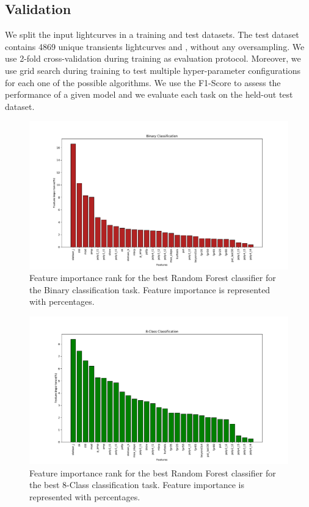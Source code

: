\documentclass[a4paper,fleqn,usenatbib]{mnras}
\begin{document}
\subsection{Validation} \label{subsection_importances}

We split the input lightcurves in a training and test datasets. 
The test dataset contains 4869 unique transients lightcurves and , without any
oversampling. 
We use 2-fold cross-validation during training as evaluation
protocol. 
Moreover, we use grid search during training to test multiple
hyper-parameter configurations for each one  of the possible
algorithms. 
We use the F1-Score to assess the performance of a given model and 
we evaluate each task on the held-out test dataset.

\begin{figure}
	\includegraphics[width=\textwidth]{binFeatImportance.pdf}
    \caption{Feature importance rank  for the best Random Forest
      classifier for the Binary classification task. 
      Feature importance is represented with percentages.} 
    \label{Importances-Binary}
\end{figure} 

\begin{figure}
	\includegraphics[width=\textwidth]{8classFeatImportance.pdf}
    \caption{Feature importance rank for the best Random Forest
      classifier for the best 8-Class classification task. Feature
      importance is represented with percentages.} 
    \label{Importances-8-Class}
\end{figure}
\end{document}
